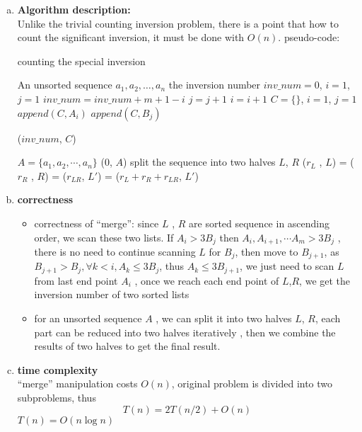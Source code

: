 \begin{enumerate}[a.)]
	\item \textbf{Algorithm description:} \\
	Unlike the trivial counting inversion problem, there is a point that how to count the significant inversion, it must be done with $O(n)$.
	pseudo-code:
	\begin{algorithm}[H]
		\caption{counting the special inversion}
		\begin{algorithmic}[1]
			\Require An unsorted sequence $a_1, a_2,\dots , a_n$	
			\Ensure  the inversion number
				\State $inv\_num = 0$, $i = 1$, $j = 1$
						\State $inv\_num = inv\_num + m+1 - i$
						\State $j = j+1$
					\Else
						\State $i = i +1 $
					\EndIf 
				\EndWhile
				\State $C = \{\}$, $i = 1$, $j=1$
						\State $append(C,{A_i})$
					\Else
						\State $append(C,{B_j})$
					\EndIf 
				\EndFor 
				
				\State \Return ($inv\_num$, $C$)
			\EndFunction 
			
			 {$A = \{a_1,a_2,\cdots, a_n\}$}
						\State\Return ($0$, $A$)
					\EndIf
				\State split the sequence into two halves $L$, $R$ 
				\State ($r_L$ , $L$) = 
				\State ($r_R$ , $R$) = 
				\State ($r_{LR}$, $L'$) = 
				\State \Return ($r_L + r_R +r_{LR}$, $L'$)
			\EndFunction 
		\end{algorithmic}	
	\end{algorithm}
	\item \textbf{correctness} 
		\begin{itemize}
			\item correctness of ``merge'': since $L$ , $R$ are sorted sequence in ascending order, we scan these two lists. If $A_i > 3B_j$ then $A_i, A_{i+1} ,\cdots A_m > 3B_j$ , there is no need to continue scanning $L$ for $B_j$, then move to $B_{j+1}$, as $B_{j+1} > B_{j}, \forall k <i, A_{k} \leq 3B_j$, thus $A_k \leq 3B_{j+1}$, we just need to scan $L$ from last end point $A_i$ , once we reach each end point of $L$,$R$, we get the inversion number of two sorted lists
			\item  for an unsorted sequence $A$	, we can split it into two halves $L$, $R$,
			each part can be reduced into two halves iteratively , then we combine the results of two halves to get the final result.
			
			
		\end{itemize}
	
	\item \textbf{time complexity} \\	
	``merge'' manipulation costs $O(n)$, original problem is divided into two subproblems, thus
	\[
		T(n) = 2T(n/2) + O(n)
	\]
	$T(n) = O(n\log n)$
	
	
\end{enumerate}
